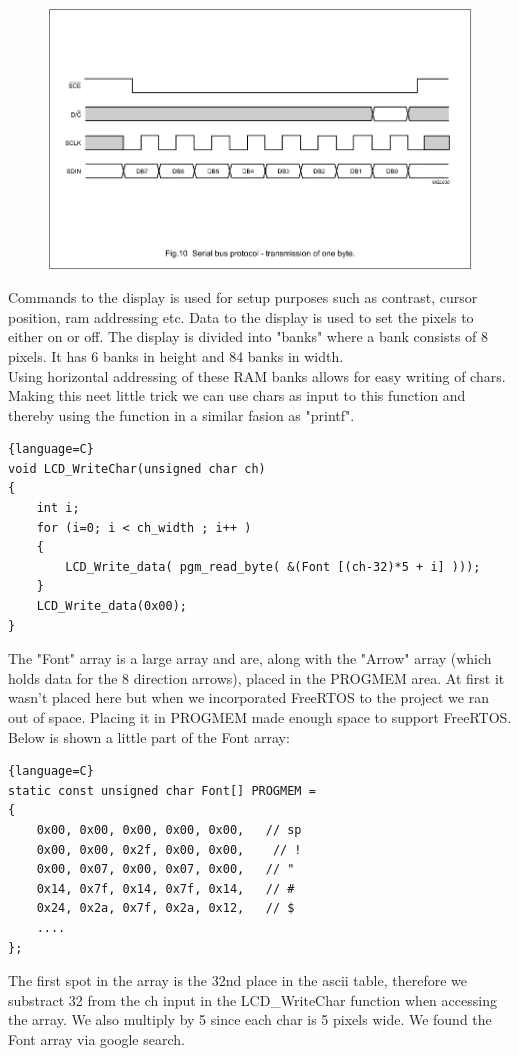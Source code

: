 \begin{figure}[hbpt]
\centering
\includegraphics[width=.8\textwidth]{billeder/Display_protocol}
\end{figure}

Commands to the display is used for setup purposes such as contrast, cursor position, ram addressing etc. Data to the display is used to set the pixels to either on or off. The display is divided into "banks" where a bank consists of 8 pixels. It has 6 banks in height and 84 banks in width.\\
Using horizontal addressing of these RAM banks allows for easy writing of chars. Making this neet little trick we can use chars as input to this function and thereby using the function in a similar fasion as "printf".
\begin{lstlisting}{language=C}
void LCD_WriteChar(unsigned char ch)
{
	int i;
	for (i=0; i < ch_width ; i++ )
	{
		LCD_Write_data( pgm_read_byte( &(Font [(ch-32)*5 + i] )));	
	}
	LCD_Write_data(0x00);			
}
\end{lstlisting}
The "Font" array is a large array and are, along with the "Arrow" array (which holds data for the 8 direction arrows), placed in the PROGMEM area. At first it wasn't placed here but when we incorporated FreeRTOS to the project we ran out of space. Placing it in PROGMEM made enough space to support FreeRTOS.\\
Below is shown a little part of the Font array:
\begin{lstlisting}{language=C}
static const unsigned char Font[] PROGMEM =
{
	0x00, 0x00, 0x00, 0x00, 0x00,   // sp 
	0x00, 0x00, 0x2f, 0x00, 0x00,    // ! 
	0x00, 0x07, 0x00, 0x07, 0x00,   // "  
	0x14, 0x7f, 0x14, 0x7f, 0x14,   // #  
	0x24, 0x2a, 0x7f, 0x2a, 0x12,   // $  
	....  
};
\end{lstlisting}

The first spot in the array is the 32nd place in the ascii table, therefore we substract 32 from the ch input in the LCD\_WriteChar function when accessing the array. We also multiply by 5 since each char is 5 pixels wide. We found the Font array via google search.


